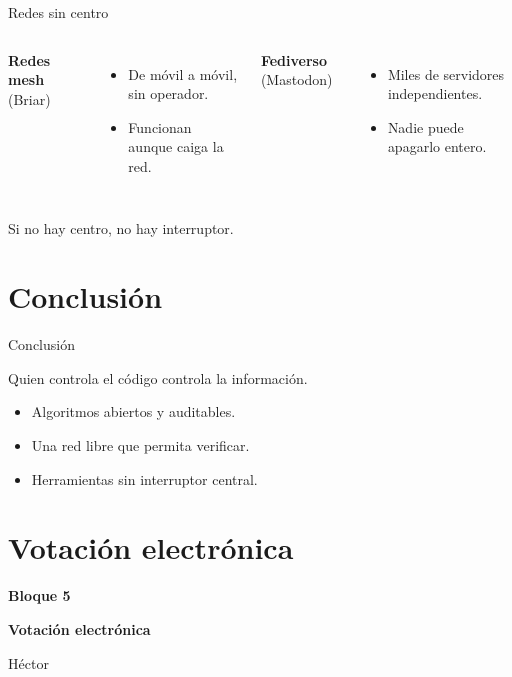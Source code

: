 \documentclass[aspectratio=169,12pt]{beamer}
\newcommand{\bloque}[3]{%
  \begin{frame}[plain]
    \vfill
    \begin{center}
      {\color{terra}\large\bfseries Bloque #1}\\[0.3cm]
      {\color{azul}\LARGE\bfseries #2\par}\vspace{0.5cm}
      {\large #3}
    \end{center}
    \vfill
  \end{frame}}
\begin{document}
\begin{frame}{Redes sin centro}
  \begin{columns}[T]
      \textbf{Redes mesh} (Briar)
      \begin{itemize}
        \item De móvil a móvil, sin operador.
        \item Funcionan aunque caiga la red.
      \end{itemize}
      \textbf{Fediverso} (Mastodon)
      \begin{itemize}
        \item Miles de servidores independientes.
        \item Nadie puede apagarlo entero.
      \end{itemize}
  \end{columns}
  \vspace{0.6cm}
  {\large\alert{Si no hay centro, no hay interruptor.}}
\end{frame}

\section{Conclusión}
\begin{frame}{Conclusión}
  \begin{center}
    {\Large Quien controla el código controla la información.}
  \end{center}
  \vspace{0.3cm}
  \begin{itemize}
    \item Algoritmos abiertos y auditables.
    \item Una red libre que permita verificar.
    \item Herramientas sin interruptor central.
  \end{itemize}
\end{frame}

\section{Votación electrónica}
\bloque{5}{Votación electrónica}{Héctor}
\end{document}
